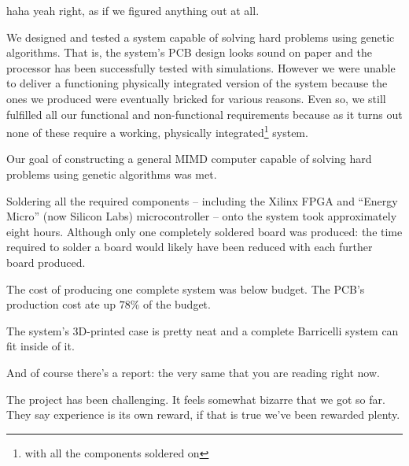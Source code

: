 haha yeah right, as if we figured anything out at all.




We designed and tested a system capable of solving hard problems using genetic algorithms.
That is, the system's PCB design looks sound on paper and the processor has been successfully tested with simulations.
However we were unable to deliver a functioning physically integrated version of the system because the ones we produced were eventually bricked for various reasons.
Even so, we still fulfilled all our functional and non-functional requirements because as it turns out none of these require a working, physically integrated\footnote{with all the components soldered on} system.

Our goal of constructing a general MIMD computer capable of solving hard problems using genetic algorithms was met.





Soldering all the required components -- including the Xilinx FPGA and ``Energy Micro'' (now Silicon Labs) microcontroller --  onto the system took approximately eight hours.
Although only one completely soldered board was produced: the time required to solder a board would likely have been reduced with each further board produced.

The cost of producing one complete system was below budget.
The PCB's production cost ate up $78\%$ of the budget.

The system's 3D-printed case is pretty neat and a complete Barricelli system can fit inside of it. 


And of course there's a report: the very same that you are reading right now.

The project has been challenging.
It feels somewhat bizarre that we got so far.
They say experience is its own reward, if that is true we've been rewarded plenty.

